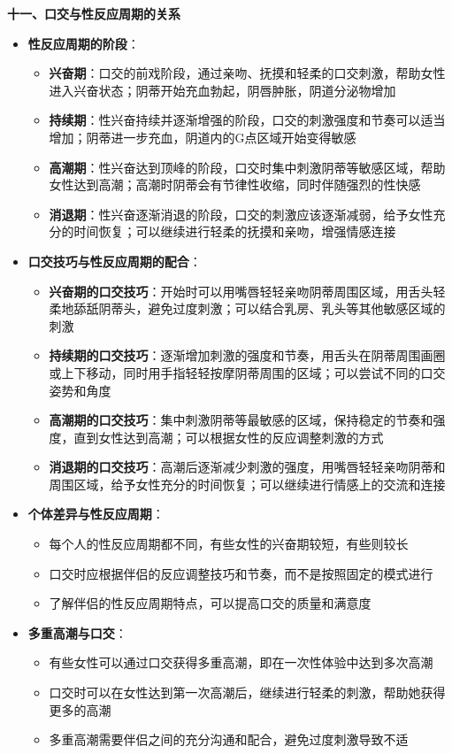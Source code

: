 \documentclass[12pt,UTF8]{ctexbook}
\begin{document}
  \textbf{十一、口交与性反应周期的关系}
  \begin{itemize}
  \item \textbf{性反应周期的阶段}：
    \begin{itemize}
    \item \textbf{兴奋期}：口交的前戏阶段，通过亲吻、抚摸和轻柔的口交刺激，帮助女性进入兴奋状态；阴蒂开始充血勃起，阴唇肿胀，阴道分泌物增加
    \item \textbf{持续期}：性兴奋持续并逐渐增强的阶段，口交的刺激强度和节奏可以适当增加；阴蒂进一步充血，阴道内的G点区域开始变得敏感
    \item \textbf{高潮期}：性兴奋达到顶峰的阶段，口交时集中刺激阴蒂等敏感区域，帮助女性达到高潮；高潮时阴蒂会有节律性收缩，同时伴随强烈的性快感
    \item \textbf{消退期}：性兴奋逐渐消退的阶段，口交的刺激应该逐渐减弱，给予女性充分的时间恢复；可以继续进行轻柔的抚摸和亲吻，增强情感连接
    \end{itemize}
  \item \textbf{口交技巧与性反应周期的配合}：
    \begin{itemize}
    \item \textbf{兴奋期的口交技巧}：开始时可以用嘴唇轻轻亲吻阴蒂周围区域，用舌头轻柔地舔舐阴蒂头，避免过度刺激；可以结合乳房、乳头等其他敏感区域的刺激
    \item \textbf{持续期的口交技巧}：逐渐增加刺激的强度和节奏，用舌头在阴蒂周围画圈或上下移动，同时用手指轻轻按摩阴蒂周围的区域；可以尝试不同的口交姿势和角度
    \item \textbf{高潮期的口交技巧}：集中刺激阴蒂等最敏感的区域，保持稳定的节奏和强度，直到女性达到高潮；可以根据女性的反应调整刺激的方式
    \item \textbf{消退期的口交技巧}：高潮后逐渐减少刺激的强度，用嘴唇轻轻亲吻阴蒂和周围区域，给予女性充分的时间恢复；可以继续进行情感上的交流和连接
    \end{itemize}
  \item \textbf{个体差异与性反应周期}：
    \begin{itemize}
    \item 每个人的性反应周期都不同，有些女性的兴奋期较短，有些则较长
    \item 口交时应根据伴侣的反应调整技巧和节奏，而不是按照固定的模式进行
    \item 了解伴侣的性反应周期特点，可以提高口交的质量和满意度
    \end{itemize}
  \item \textbf{多重高潮与口交}：
    \begin{itemize}
    \item 有些女性可以通过口交获得多重高潮，即在一次性体验中达到多次高潮
    \item 口交时可以在女性达到第一次高潮后，继续进行轻柔的刺激，帮助她获得更多的高潮
    \item 多重高潮需要伴侣之间的充分沟通和配合，避免过度刺激导致不适
    \end{itemize}
  \end{itemize}
\end{document}
